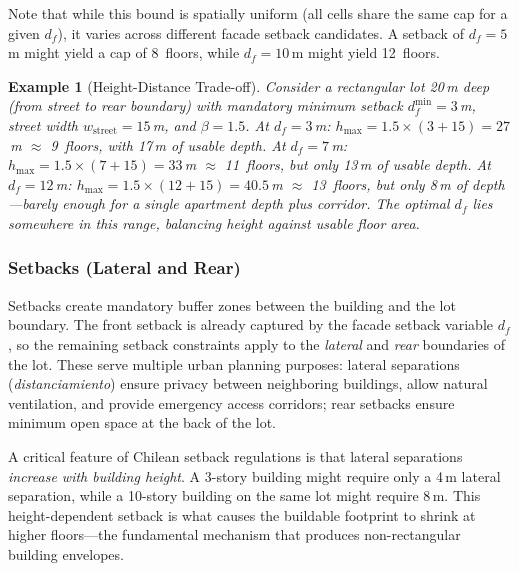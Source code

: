 \documentclass[11pt,a4paper]{article}
\newtheorem{example}{Example}
\begin{document}
Note that while this bound is spatially uniform (all cells share the
same cap for a given $d_f$), it varies across different facade setback
candidates. A setback of $d_f = 5$\,m might yield a cap of 8~floors,
while $d_f = 10$\,m might yield 12~floors.

\begin{example}[Height-Distance Trade-off]
Consider a rectangular lot 20\,m deep (from street to rear boundary)
with mandatory minimum setback $d_f^{\min} = 3$\,m, street width
$w_{\text{street}} = 15$\,m, and $\beta = 1.5$. At $d_f = 3$\,m:
$h_{\max} = 1.5 \times (3 + 15) = 27$\,m $\approx$ 9~floors, with
17\,m of usable depth. At $d_f = 7$\,m: $h_{\max} = 1.5 \times (7 +
15) = 33$\,m $\approx$ 11~floors, but only 13\,m of usable depth. At
$d_f = 12$\,m: $h_{\max} = 1.5 \times (12 + 15) = 40.5$\,m $\approx$
13~floors, but only 8\,m of depth---barely enough for a single
apartment depth plus corridor. The optimal $d_f$ lies somewhere in
this range, balancing height against usable floor area.
\end{example}

\subsubsection{Setbacks (Lateral and Rear)}

Setbacks create mandatory buffer zones between the building and the lot
boundary. The front setback is already captured by the facade setback
variable $d_f$, so the remaining setback constraints apply to the
\emph{lateral} and \emph{rear} boundaries of the lot. These serve
multiple urban planning purposes: lateral separations
(\emph{distanciamiento}) ensure privacy between neighboring buildings,
allow natural ventilation, and provide emergency access corridors; rear
setbacks ensure minimum open space at the back of the lot.

A critical feature of Chilean setback regulations is that lateral
separations \emph{increase with building height}. A 3-story building
might require only a 4\,m lateral separation, while a 10-story building
on the same lot might require 8\,m. This height-dependent setback is
what causes the buildable footprint to shrink at higher floors---the
fundamental mechanism that produces non-rectangular building envelopes.
\end{document}
